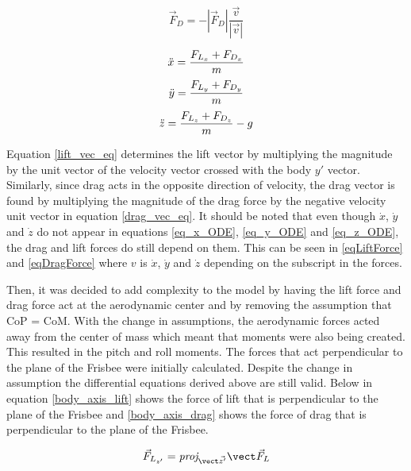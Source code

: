 \documentclass[12pt,twoside,letterpaper]{article}
\begin{document}
\begin{multicols}{2}
\begin{equation}
\vec{F}_D = -\left|\vec{F}_D\right|\frac{\vec{v}}{\left|\vec{v}\right|}
\label{drag_vec_eq}
\end{equation}

\begin{equation}
\centering
\ddot{x} = \frac{F_{L_{x}} + F_{D_{x}}}{m}
\label{eq_x_ODE}
\end{equation}
\begin{equation}
\centering
\ddot{y} = \frac{F_{L_{y}} + F_{D_{y}}}{m}
\label{eq_y_ODE}
\end{equation}
\begin{equation}
\centering
\ddot{z} = \frac{F_{L_{z}} + F_{D_{z}}}{m}-g
\label{eq_z_ODE}
\end{equation}

Equation \ref{lift_vec_eq} determines the lift vector by multiplying the magnitude by the unit vector of the velocity vector crossed with the body $y'$  vector. Similarly, since drag acts in the opposite direction of velocity, the drag vector is found by multiplying the magnitude of the drag force by the negative velocity unit vector in equation \eqref{drag_vec_eq}. It should be noted that even though $\dot{x}$, $\dot{y}$ and $\dot{z}$ do not appear in equations \eqref{eq_x_ODE}, \eqref{eq_y_ODE} and \eqref{eq_z_ODE}, the drag and lift forces do still depend on them. This can be seen in \eqref{eqLiftForce} and \eqref{eqDragForce} where $v$ is $\dot{x}$, $\dot{y}$ and $\dot{z}$ depending on the subscript in the forces.
\par

Then, it was decided to add complexity to the model by having the lift force and drag force act at the aerodynamic center and by removing the assumption that CoP = CoM. With the change in assumptions, the aerodynamic forces acted away from the center of mass which meant that moments were also being created. This resulted in the pitch and roll moments. The forces that act perpendicular to the plane of the Frisbee were initially calculated. Despite the change in assumption the differential equations derived above are still valid. Below in equation \eqref{body_axis_lift} shows the force of lift that is perpendicular to the plane of the Frisbee and \eqref{body_axis_drag} shows the force of drag that is perpendicular to the plane of the Frisbee.

\begin{equation}
    \vec{F}_{L_{z'}} = \vectorproj[\vec{z'}]{\vec{F}_L}
    \label{body_axis_lift}
\end{equation}


\end{multicols}
\end{document}
